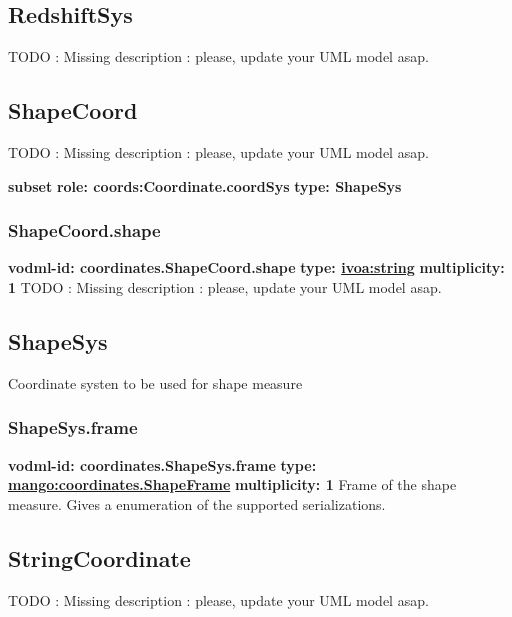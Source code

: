   \subsection{RedshiftSys}
  \label{sect:coordinates.RedshiftSys}
    TODO : Missing description : please, update your UML model asap.

  \subsection{ShapeCoord}
  \label{sect:coordinates.ShapeCoord}
    TODO : Missing description : please, update your UML model asap.

    \noindent \textbf{subset} \newline
    \indent   \textbf{role: coords:Coordinate.coordSys} \newline
    \indent   \textbf{type: ShapeSys} \newline


    \subsubsection{ShapeCoord.shape}
      \textbf{vodml-id: coordinates.ShapeCoord.shape} \newline
      \textbf{type: \hyperref[sect:ivoa]{ivoa:string}} \newline
      \textbf{multiplicity: 1} \newline 
      TODO : Missing description : please, update your UML model asap.

  \subsection{ShapeSys}
  \label{sect:coordinates.ShapeSys}
    Coordinate systen to be used for shape measure

    \subsubsection{ShapeSys.frame}
      \textbf{vodml-id: coordinates.ShapeSys.frame} \newline
      \textbf{type: \hyperref[sect:coordinates.ShapeFrame]{mango:coordinates.ShapeFrame}} \newline
      \textbf{multiplicity: 1} \newline 
      Frame of the shape measure. Gives a enumeration of the supported serializations.

  \subsection{StringCoordinate}
  \label{sect:coordinates.StringCoordinate}
    TODO : Missing description : please, update your UML model asap.

